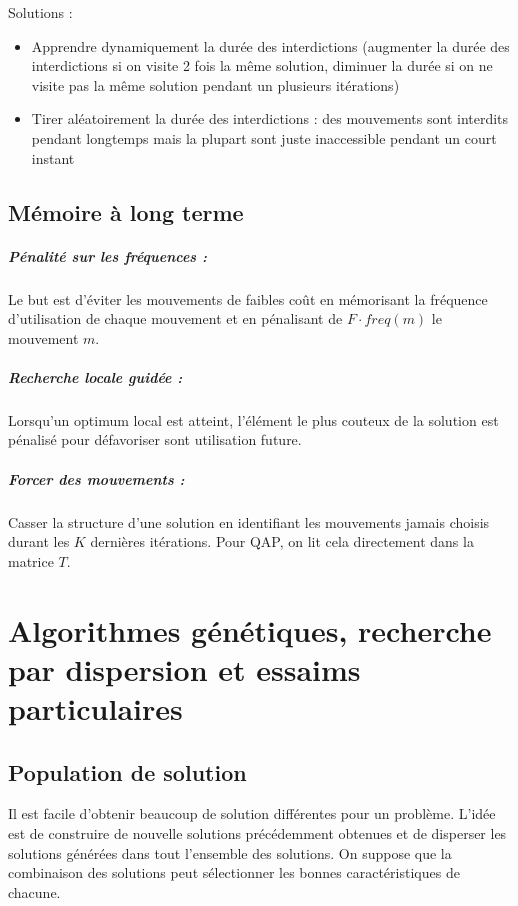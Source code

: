 \documentclass[11pt,a4paper]{report}
\begin{document}
Solutions :
\begin{itemize}
    \item Apprendre dynamiquement la durée des inter\-dictions (augmenter la durée des inter\-dictions si on visite 2 fois la même solution, diminuer la durée si on ne visite pas la même solution pendant un plusieurs itérations)
    \item Tirer aléatoirement la durée des interdictions : des mouvements sont interdits pendant longtemps mais la plupart sont juste inaccessible pendant un court instant
\end{itemize}

\section{Mémoire à long terme}
\paragraph*{Pénalité sur les fréquences : }Le but est d'éviter les mouvements de faibles coût en mémo\-risant la fréquence d'utilisation de chaque mouvement et en pénalisant de $F\cdot freq(m)$ le mouvement $m$.
\paragraph*{Recherche locale guidée : } Lorsqu'un optimum local est atteint, l'élément le plus couteux de la solution est pénalisé pour défavoriser sont utilisation future.
\paragraph*{Forcer des mouvements : } Casser la structure d'une solution en identifiant les mouvements jamais choisis durant les $K$ dernières itérations. Pour QAP, on lit cela directement dans la matrice $T$.

\chapter{Algorithmes génétiques, recherche par dispersion et essaims particulaires}

\section{Population de solution}
Il est facile d'obtenir beaucoup de solution différentes pour un problème. L'idée est de construire de nouvelle solutions précédemment obtenues et de disperser les solutions générées dans tout l'ensemble des solutions. On suppose que la combinaison des solutions peut sélectionner les bonnes caractéristiques de chacune.
\end{document}
